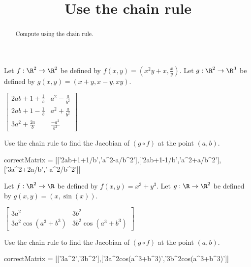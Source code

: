\documentclass{ximera}
\title{Use the chain rule}
\begin{document}
	\begin{abstract}
		Compute using the chain rule.
	\end{abstract}\maketitle
	
			
	\begin{question}
		Let $f:\R^2 \to \R^2$ be defined by $f(x,y)=(x^2y+x,\frac{x}{y})$.  Let 
		$g:\R^2 \to \R^3$ be defined by $g(x,y) = (x+y,x-y,xy)$.  
		\begin{solution}
			\begin{hint}
				\(\begin{bmatrix} 
				2ab+1+\frac{1}{b}& a^2-\frac{a}{b^2}\\
				2ab+1-\frac{1}{b}& a^2+\frac{a}{b^2}\\
				3a^2+\frac{2a}{b} & \frac{-a^2}{b^2}
				\end{bmatrix}\)
			\end{hint}
		Use the chain rule to find the
		Jacobian of $(g \circ f)$ at the point $(a,b)$.
		
		\begin{matrix-answer}
			correctMatrix = [['2ab+1+1/b','a^2-a/b^2'],['2ab+1-1/b','a^2+a/b^2'],['3a^2+2a/b','-a^2/b^2']]
		\end{matrix-answer}
		\end{solution}
	\end{question}	
	
	\begin{question}
		Let $f:\R^2 \to \R$ be defined by $f(x,y)=x^3+y^3$.  Let 
		$g:\R \to \R^2$ be defined by $g(x,y) = (x, \sin(x))$.  
		\begin{solution}
			\begin{hint}
				\(\begin{bmatrix} 
				3a^2& 3b^2\\
				3a^2\cos(a^3+b^3)& 3b^2\cos(a^3+b^3)
				\end{bmatrix}\)
			\end{hint}
		Use the chain rule to find the
		Jacobian of $(g \circ f)$ at the point $(a,b)$.
		
		\begin{matrix-answer}
			correctMatrix = [['3a^2','3b^2'],['3a^2cos(a^3+b^3)','3b^2cos(a^3+b^3)']]
		\end{matrix-answer}
		\end{solution}
	\end{question}	
	
\end{document}
